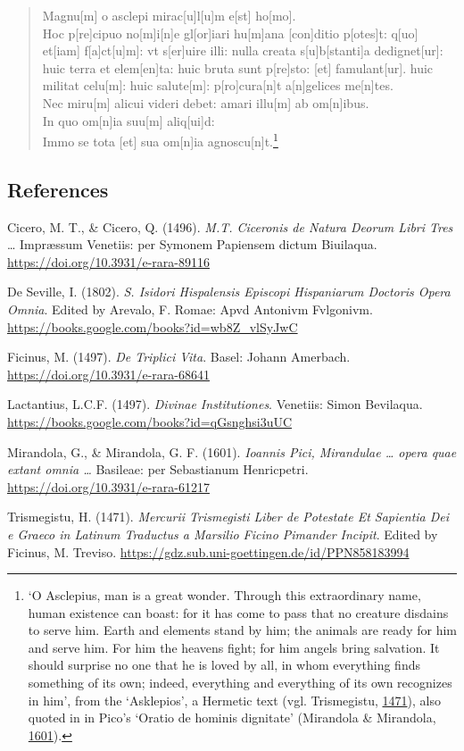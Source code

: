 \documentclass[
]{article}
\begin{document}
\begin{quote}
Magnu{[}m{]} o asclepi mirac{[}u{]}l{[}u{]}m e{[}st{]} ho{[}mo{]}.\\
Hoc p{[}re{]}cipuo no{[}m{]}i{[}n{]}e gl{[}or{]}iari hu{[}m{]}ana
{[}con{]}ditio p{[}otes{]}t: q{[}uo{]} et{[}iam{]}
f{[}a{]}ct{[}u{]}m{]}: vt s{[}er{]}uire illi: nulla creata
s{[}u{]}b{[}stanti{]}a dedignet{[}ur{]}: huic terra et elem{[}en{]}ta:
huic bruta sunt p{[}re{]}sto: {[}et{]} famulant{[}ur{]}. huic militat
celu{[}m{]}: huic salute{[}m{]}: p{[}ro{]}cura{[}n{]}t a{[}n{]}gelices
me{[}n{]}tes.\\
Nec miru{[}m{]} alicui videri debet: amari illu{[}m{]} ab
om{[}n{]}ibus.\\
In quo om{[}n{]}ia suu{[}m{]} aliq{[}ui{]}d:\\
Immo se tota {[}et{]} sua om{[}n{]}ia agnoscu{[}n{]}t.\footnote{`O
  Asclepius, man is a great wonder. Through this extraordinary name,
  human existence can boast: for it has come to pass that no creature
  disdains to serve him. Earth and elements stand by him; the animals
  are ready for him and serve him. For him the heavens fight; for him
  angels bring salvation. It should surprise no one that he is loved by
  all, in whom everything finds something of its own; indeed, everything
  and everything of its own recognizes in him', from the `Asklepios', a
  Hermetic text (vgl. Trismegistu,
  \href{https://gdz.sub.uni-goettingen.de/id/PPN858183994}{1471}), also
  quoted in in Pico's `Oratio de hominis dignitate' (Mirandola \&
  Mirandola, \href{https://doi.org/10.3931/e-rara-61217}{1601}).}
\end{quote}

\hypertarget{references}{%
\subsection{References}\label{references}}

Cicero, M. T., \& Cicero, Q. (1496). \emph{M.T. Ciceronis de Natura
Deorum Libri Tres} \ldots{} Impræssum Venetiis: per Symonem Papiensem
dictum Biuilaqua. \url{https://doi.org/10.3931/e-rara-89116}

De Seville, I. (1802). \emph{S. Isidori Hispalensis Episcopi Hispaniarum
Doctoris Opera Omnia}. Edited by Arevalo, F. Romae: Apvd Antonivm
Fvlgonivm. \url{https://books.google.com/books?id=wb8Z_vlSyJwC}

Ficinus, M. (1497). \emph{De Triplici Vita}. Basel: Johann Amerbach.
\url{https://doi.org/10.3931/e-rara-68641}

Lactantius, L.C.F. (1497). \emph{Divinae Institutiones}. Venetiis: Simon
Bevilaqua. \url{https://books.google.com/books?id=qGsnghsi3uUC}

Mirandola, G., \& Mirandola, G. F. (1601). \emph{Ioannis Pici,
Mirandulae \ldots{} opera quae extant omnia \ldots{}} Basileae: per
Sebastianum Henricpetri. \url{https://doi.org/10.3931/e-rara-61217}

Trismegistu, H. (1471). \emph{Mercurii Trismegisti Liber de Potestate Et
Sapientia Dei e Graeco in Latinum Traductus a Marsilio Ficino Pimander
Incipit}. Edited by Ficinus, M. Treviso.
\url{https://gdz.sub.uni-goettingen.de/id/PPN858183994}
\end{document}
